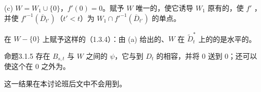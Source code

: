 (c) $W=W_1\cup\{0\}$，$f'(0)=0$。赋予 $W$ 唯一的，使它诱导 $W_1$ 原有的，使 $f'$ ，并使 $f'^{-1}(\overline D_{t'})$（$t'<t$）为 $W_1\cap f'^{-1}(\overline D_{t'})$ 的单点。

在 $W-\{0\}$ 上赋予这样的（1.3.4）：由 (a) 给出的、$W$ 在 $\widetilde D_t^*$ 上的的是水平的。

\begin{SGAresult}{命题}{3.1.5}
存在 $B_{s,t}$ 与 $W$ 之间的 $\psi$，它与到 $D_t$ 的相容，并将 $0$ 送到 $0$；还可以使这个在 $0$ 之外为。
\end{SGAresult}

这一结果在本讨论班后文中不会用到。

